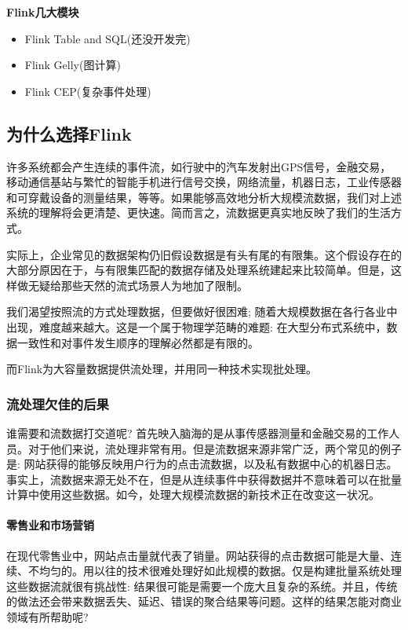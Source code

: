 \documentclass{ctexart}
\begin{document}
\textbf{Flink几大模块}

\begin{itemize}
\item Flink Table and SQL(还没开发完)
\item Flink Gelly(图计算)
\item Flink CEP(复杂事件处理)
\end{itemize}

\subsection{为什么选择Flink}

许多系统都会产生连续的事件流，如行驶中的汽车发射出GPS信号，金融交易，移动通信基站与繁忙的智能手机进行信号交换，网络流量，机器日志，工业传感器和可穿戴设备的测量结果，等等。如果能够高效地分析大规模流数据，我们对上述系统的理解将会更清楚、更快速。简而言之，流数据更真实地反映了我们的生活方式。

实际上，企业常见的数据架构仍旧假设数据是有头有尾的有限集。这个假设存在的大部分原因在于，与有限集匹配的数据存储及处理系统建起来比较简单。但是，这样做无疑给那些天然的流式场景人为地加了限制。

我们渴望按照流的方式处理数据，但要做好很困难; 随着大规模数据在各行各业中出现，难度越来越大。这是一个属于物理学范畴的难题: 在大型分布式系统中，数据一致性和对事件发生顺序的理解必然都是有限的。

而Flink为大容量数据提供流处理，并用同一种技术实现批处理。

\subsubsection{流处理欠佳的后果}

谁需要和流数据打交道呢? 首先映入脑海的是从事传感器测量和金融交易的工作人员。对于他们来说，流处理非常有用。但是流数据来源非常广泛，两个常见的例子是: 网站获得的能够反映用户行为的点击流数据，以及私有数据中心的机器日志。事实上，流数据来源无处不在，但是从连续事件中获得数据并不意味着可以在批量计算中使用这些数据。如今，处理大规模流数据的新技术正在改变这一状况。

\paragraph{零售业和市场营销}

在现代零售业中，网站点击量就代表了销量。网站获得的点击数据可能是大量、连续、不均匀的。用以往的技术很难处理好如此规模的数据。仅是构建批量系统处理这些数据流就很有挑战性: 结果很可能是需要一个庞大且复杂的系统。并且，传统的做法还会带来数据丢失、延迟、错误的聚合结果等问题。这样的结果怎能对商业领域有所帮助呢?
\end{document}

